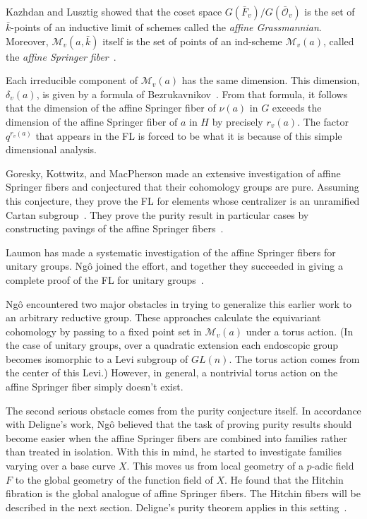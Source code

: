 \documentclass[brochure,english,12pt]{bourbaki}
\theoremstyle{plain}
\def\M{{\mathcal M}}
\def\O{{\mathcal O}}
\begin{document}
Kazhdan and Lusztig showed that the coset space $G(\bar
F_v)/G(\bar\O_v)$ is the set of $\bar k$-points of an inductive limit
of schemes called the {\it affine Grassmannian}.  Moreover, $\M_v(a,\bar k)$ itself
is the set of points of an ind-scheme $\M_v(a)$, called the {\it affine
Springer fiber}~\cite{KL:1988}.

Each irreducible component of $\M_v(a)$ has the same dimension.  This
dimension, $\delta_v(a)$, is given by a formula of
Bezrukavnikov~\cite{Bezrukavnikov}.  From that formula, it follows
that the dimension of the affine Springer fiber of $\nu(a)$ in $G$
exceeds the dimension of the affine Springer fiber of $a$ in $H$ by
precisely $r_v(a)$.  The factor $q^{r_v(a)}$ that appears in the FL is
forced to be what it is because of this simple dimensional analysis.

Goresky, Kottwitz, and MacPherson made an extensive investigation of
affine Springer fibers and conjectured that their 
cohomology groups are pure.  Assuming this conjecture, they prove the
FL for elements whose centralizer is an unramified Cartan
subgroup~\cite{GKM:2004}.  They prove the purity result in particular
cases by constructing pavings of the affine Springer
fibers~\cite{GKM:2006}.  

Laumon has made a systematic investigation of
the affine Springer fibers for unitary groups.  Ng\^o joined the effort, and together they
succeeded in giving a complete proof of the FL for unitary groups~\cite{LN:08}.

Ng\^o encountered two major obstacles in trying to generalize this
earlier work to an arbitrary reductive group.  These approaches
calculate the equivariant cohomology by passing to a fixed point set in $\M_v(a)$
under a torus action.  (In the case of unitary
groups, over a quadratic extension each endoscopic group becomes
isomorphic to a Levi subgroup of $GL(n)$.  The torus action comes from
the center of this Levi.)  However, in general, a nontrivial torus
action on the affine Springer fiber simply doesn't exist.

The second serious obstacle comes from the purity conjecture itself.
In accordance with Deligne's work, Ng\^o believed that the task of
proving purity results should become easier when the affine Springer
fibers are combined into families rather than treated in isolation.
With this in mind, he started to investigate families varying over a
base curve $X$.  This moves us from local geometry of a $p$-adic
field $F$ to the global geometry of the function field of $X$.  He
found that the Hitchin fibration is the global analogue of affine
Springer fibers.  The Hitchin fibers will be
described in the next section.  Deligne's purity theorem applies in this
setting~\cite{Deligne:Weil2}.
\end{document}
